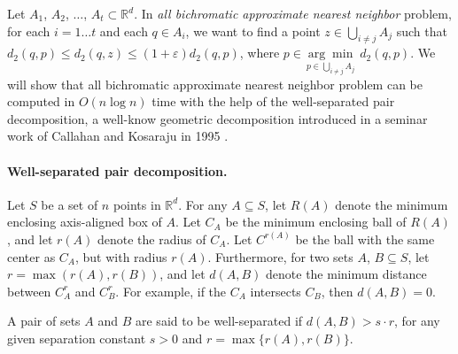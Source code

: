 \documentclass[a4paper,UKenglish,cleveref, autoref, thm-restate]{lipics-v2021}
\newcommand{\ignore}[1]{}
\begin{document}
Let  $A_1$, $A_2$, $\dots$, $A_t \subset \mathbb{R}^d$. In {\it all bichromatic approximate nearest neighbor} problem, for each $i = 1 \dots t$ and each $q \in A_i$, we want to find 
a point $ z \in \bigcup \limits_{i \neq j} A_j$ such that $d_2(q,p)\le d_2(q,z) \le (1+\varepsilon) d_2(q, p)$, where 
$
	p \in \underset{{p \in \bigcup \limits_{i \neq j} A_j}}{\arg \min }\;  d_2 \left(q, p\right).
$
We will show that all bichromatic approximate nearest neighbor problem can be computed in $O(n\log n)$ time with the 
help of the well-separated pair decomposition, a well-know geometric decomposition introduced in a seminar work of 
Callahan and Kosaraju in 1995 \cite{callahan95-phd, callahan95}.

\paragraph{Well-separated pair decomposition.} Let $S$ be a set of $n$ points in $\mathbb{R}^d$. For any $A \subseteq S$, let $R(A)$ denote the minimum enclosing axis-aligned box of $A$.  Let $C_A$ be the minimum enclosing ball of $R(A)$, and let 
$r(A)$ denote the radius of $C_A$.  Let $C^{r(A)}$ be the ball with the same center as 
$C_A$, but with radius $r(A)$.  Furthermore, for two sets $A$, $B \subseteq S$, let $r = \max(r(A), r(B))$, and let $d(A, B)$ denote the minimum distance between $C^{r}_A$ and $C^{r}_B$.  For example, if the $C_A$ intersects $C_B$, then $d(A,B) = 0$.

\begin{definition}
A pair of sets $A$ and $B$ are said to be well-separated if $d(A, B) > s \cdot r$, for 
any given separation constant $s>0$ and $r = \max\{r(A), r(B)\}$. 
\end{definition}

\ignore{
\begin{figure}
  \centering
  \texttt{[image: figures/dumbell.png]} 
  \caption{An example of a dumbbell for a pair of sets $(A, B)$. }
  \label{fig:fig1}
\end{figure}
}%
 
\end{document}
